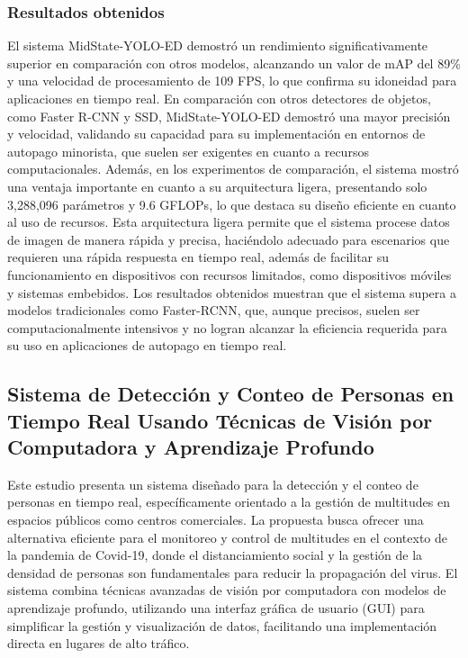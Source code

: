 \subsubsection{Resultados obtenidos}
El sistema MidState-YOLO-ED demostró un rendimiento significativamente superior en comparación con otros modelos, alcanzando un valor de mAP del 89\% y una velocidad de procesamiento de 109 FPS, lo que confirma su idoneidad para aplicaciones en tiempo real. En comparación con otros detectores de objetos, como Faster R-CNN y SSD, MidState-YOLO-ED demostró una mayor precisión y velocidad, validando su capacidad para su implementación en entornos de autopago minorista, que suelen ser exigentes en cuanto a recursos computacionales. Además, en los experimentos de comparación, el sistema mostró una ventaja importante en cuanto a su arquitectura ligera, presentando solo 3,288,096 parámetros y 9.6 GFLOPs, lo que destaca su diseño eficiente en cuanto al uso de recursos. Esta arquitectura ligera permite que el sistema procese datos de imagen de manera rápida y precisa, haciéndolo adecuado para escenarios que requieren una rápida respuesta en tiempo real, además de facilitar su funcionamiento en dispositivos con recursos limitados, como dispositivos móviles y sistemas embebidos. Los resultados obtenidos muestran que el sistema supera a modelos tradicionales como Faster-RCNN, que, aunque precisos, suelen ser computacionalmente intensivos y no logran alcanzar la eficiencia requerida para su uso en aplicaciones de autopago en tiempo real.



\subsection{Sistema de Detección y Conteo de Personas en Tiempo Real Usando Técnicas de Visión por Computadora y Aprendizaje Profundo}

Este estudio presenta un sistema diseñado para la detección y el conteo de personas en tiempo real, específicamente orientado a la gestión de multitudes en espacios públicos como centros comerciales. La propuesta busca ofrecer una alternativa eficiente para el monitoreo y control de multitudes en el contexto de la pandemia de Covid-19, donde el distanciamiento social y la gestión de la densidad de personas son fundamentales para reducir la propagación del virus. El sistema combina técnicas avanzadas de visión por computadora con modelos de aprendizaje profundo, utilizando una interfaz gráfica de usuario (GUI) para simplificar la gestión y visualización de datos, facilitando una implementación directa en lugares de alto tráfico.



